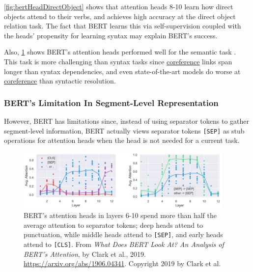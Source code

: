 \begin{figure}
\begin{minipage}{.4\textwidth}
  \label{fig:bertCoref}
\end{minipage}
\end{figure}


\cref{fig:bertHeadDirectObject} shows that attention heads 8-10 learn how direct objects attend to their verbs, and achieves high accuracy at the direct object relation task. The fact that BERT learns this via self-supervision coupled with the heads' propensity for learning syntax may explain BERT's success. 

Also, \cref{fig:bertCoref} shows BERT's attention heads performed well for the semantic task . This task is more challenging than syntax tasks since \hyperref[nlptask:coreferenceresolutionCR]{coreference} links span longer than syntax dependencies, and even state-of-the-art models do worse at \hyperref[nlptask:coreferenceresolutionCR]{coreference} than syntactic resolution. 




\subsubsection{BERT's Limitation In Segment-Level Representation}

However, BERT has limitations since, instead of using separator tokens to gather segment-level information, BERT actually views separator tokens \texttt{[SEP]} as stub operations for attention heads when the head is not needed for a current task. 

\begin{figure}[h]
\vspace{-5pt}
\centering
\includegraphics[width=0.95\textwidth]{imgs/bert_attentionheads_SEP.png}
\vspace{-5pt}
\caption{\footnotesize BERT's attention heads in layers 6-10 spend more than half the average attention to separator tokens; deep heads attend to punctuation, while middle heads attend to \texttt{[SEP]}, and early heads attend to \texttt{[CLS]}. From \emph{What Does BERT Look At? An Analysis of BERT's Attention}, by Clark et al., 2019. \url{https://arxiv.org/abs/1906.04341}. Copyright 2019 by Clark et al.}
\vspace{-5pt}
\label{fig:bertSEPAttention}
\end{figure}

